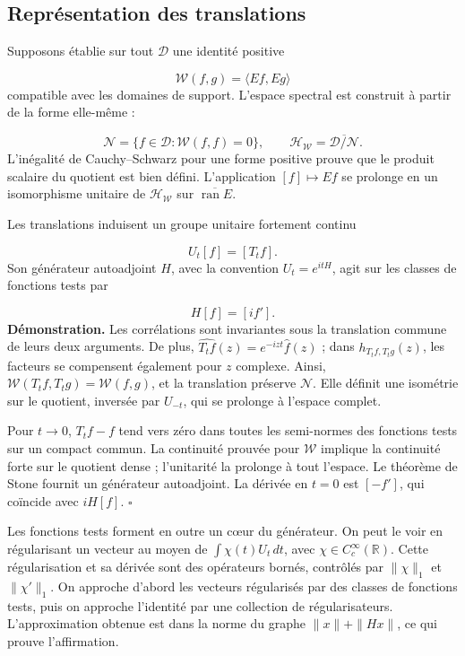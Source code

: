 \subsection{Représentation des translations}
\label{rz:traslaciones}
Supposons établie sur tout \(\mathcal D\) une identité positive

\[
\mathscr W(f,g)=\langle Ef,Eg\rangle
\]
compatible avec les domaines de support. L'espace spectral est construit à partir de la forme elle-même :

\[
\mathcal N=\{f\in\mathcal D:\mathscr W(f,f)=0\},\qquad
\mathcal H_{\mathscr W}
=\overline{\mathcal D/\mathcal N}.
\]
L’inégalité de Cauchy–Schwarz pour une forme positive prouve que le produit scalaire du quotient est bien défini. L’application \([f]\mapsto Ef\) se prolonge en un isomorphisme unitaire de \(\mathcal H_{\mathscr W}\) sur \(\overline{\operatorname{ran}E}\).

Les translations induisent un groupe unitaire fortement continu

\[
U_t[f]=[T_tf].
\]
Son générateur autoadjoint \(H\), avec la convention \(U_t=e^{itH}\), agit sur les classes de fonctions tests par

\[
H[f]=[i f'].
\]
\textbf{Démonstration.} Les corrélations sont invariantes sous la translation commune de leurs deux arguments. De plus, \(\widehat{T_tf}(z)=e^{-izt}\widehat f(z)\) ; dans \(h_{T_tf,T_tg}(z)\), les facteurs se compensent également pour \(z\) complexe. Ainsi, \(\mathscr W(T_tf,T_tg)=\mathscr W(f,g)\), et la translation préserve \(\mathcal N\). Elle définit une isométrie sur le quotient, inversée par \(U_{-t}\), qui se prolonge à l'espace complet.

Pour \(t\to0\), \(T_tf-f\) tend vers zéro dans toutes les semi-normes des fonctions tests sur un compact commun. La continuité prouvée pour \(\mathscr W\) implique la continuité forte sur le quotient dense ; l’unitarité la prolonge à tout l’espace. Le théorème de Stone fournit un générateur autoadjoint. La dérivée en \(t=0\) est \([-f']\), qui coïncide avec \(iH[f]\). \hfill\(\square\)

Les fonctions tests forment en outre un cœur du générateur. On peut le voir en régularisant un vecteur au moyen de \(\int\chi(t)U_t\,dt\), avec \(\chi\in C_c^\infty(\mathbb R)\). Cette régularisation et sa dérivée sont des opérateurs bornés, contrôlés par \(\|\chi\|_1\) et \(\|\chi'\|_1\). On approche d'abord les vecteurs régularisés par des classes de fonctions tests, puis on approche l'identité par une collection de régularisateurs. L'approximation obtenue est dans la norme du graphe \(\|x\|+\|Hx\|\), ce qui prouve l'affirmation.

